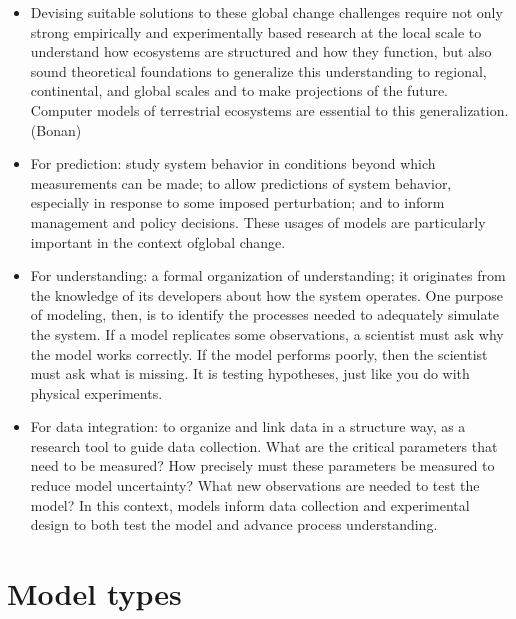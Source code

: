 \documentclass[oneside]{book}
\providecommand{\tightlist}{%
  \setlength{\itemsep}{0pt}\setlength{\parskip}{0pt}}
\begin{document}
\begin{itemize}
\tightlist
\item
  Devising suitable solutions to these global change challenges require
  not only strong empirically and experimentally based research at the
  local scale to understand how ecosystems are structured and how they
  function, but also sound theoretical foundations to generalize this
  understanding to regional, continental, and global scales and to make
  projections of the future. Computer models of terrestrial ecosystems
  are essential to this generalization. (Bonan)
\item
  For prediction: study system behavior in conditions beyond which
  measurements can be made; to allow predictions of system behavior,
  especially in response to some imposed perturbation; and to inform
  management and policy decisions. These usages of models are
  particularly important in the context ofglobal change.
\item
  For understanding: a formal organization of understanding; it
  originates from the knowledge of its developers about how the system
  operates. One purpose of modeling, then, is to identify the processes
  needed to adequately simulate the system. If a model replicates some
  observations, a scientist must ask why the model works correctly. If
  the model performs poorly, then the scientist must ask what is
  missing. It is testing hypotheses, just like you do with physical
  experiments.
\item
  For data integration: to organize and link data in a structure way, as
  a research tool to guide data collection. What are the critical
  parameters that need to be measured? How precisely must these
  parameters be measured to reduce model uncertainty? What new
  observations are needed to test the model? In this context, models
  inform data collection and experimental design to both test the model
  and advance process understanding.
\end{itemize}

\section{Model types}\label{model-types}
\end{document}
